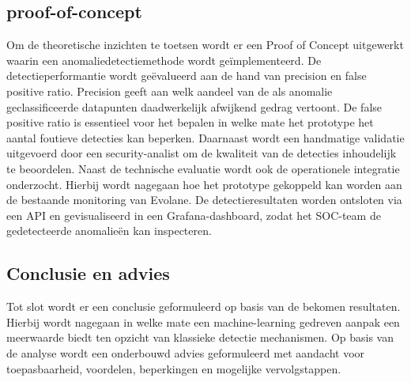 \subsection{proof-of-concept}
\label{subsec:Poc}
Om de theoretische inzichten te toetsen wordt er een Proof of Concept uitgewerkt waarin een anomaliedetectiemethode wordt geïmplementeerd. De detectieperformantie wordt geëvalueerd aan de hand van precision en false positive ratio. Precision geeft aan welk aandeel van de als anomalie geclassificeerde datapunten daadwerkelijk afwijkend gedrag vertoont. De false positive ratio is essentieel voor het bepalen in welke mate het prototype het aantal foutieve detecties kan beperken. Daarnaast wordt een handmatige validatie uitgevoerd door een security-analist om de kwaliteit van de detecties inhoudelijk te beoordelen.
Naast de technische evaluatie wordt ook de operationele integratie onderzocht. Hierbij wordt nagegaan hoe het prototype gekoppeld kan worden aan de bestaande monitoring van Evolane. De detectieresultaten worden ontsloten via een API en gevisualiseerd in een Grafana-dashboard, zodat het SOC-team de gedetecteerde anomalieën kan inspecteren.

\subsection{Conclusie en advies}
\label{subsec:conclusie en advies}
Tot slot wordt er een conclusie geformuleerd op basis van de bekomen resultaten. Hierbij wordt nagegaan in welke mate een machine-learning gedreven aanpak een meerwaarde biedt ten opzicht van klassieke detectie mechanismen. Op basis van de analyse wordt een onderbouwd advies geformuleerd met aandacht voor toepasbaarheid, voordelen, beperkingen en mogelijke vervolgstappen.




